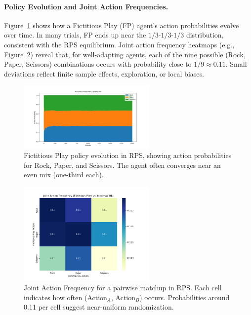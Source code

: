 \documentclass[11pt]{article}
\begin{document}
\paragraph{Policy Evolution and Joint Action Frequencies.}
Figure~\ref{fig:rps-fp-policy} shows how a Fictitious Play (FP) agent's 
action probabilities evolve over time. In many trials, FP ends up near 
the $1/3$-$1/3$-$1/3$ distribution, consistent with the RPS equilibrium. 
Joint action frequency heatmaps 
(e.g., Figure~\ref{fig:rps-joint-heatmap}) reveal that, for well-adapting 
agents, each of the nine possible (Rock, Paper, Scissors) combinations 
occurs with probability close to $1/9 \approx 0.11$. Small deviations 
reflect finite sample effects, exploration, or local biases.

\begin{figure}[htbp]
    \centering
    \includegraphics[width=0.6\textwidth]{rps-plots/fp_vs_mm_fictitious_play_policy_evolution.png}
    \caption{Fictitious Play policy evolution in RPS, showing action 
    probabilities for Rock, Paper, and Scissors. The agent often converges 
    near an even mix (one-third each).}
    \label{fig:rps-fp-policy}
\end{figure}

\begin{figure}[htbp]
    \centering
    \includegraphics[width=0.6\textwidth]{rps-plots/fp_vs_mm_joint_actions.png}
    \caption{Joint Action Frequency for a pairwise matchup in RPS. Each 
    cell indicates how often (Action$_{A}$, Action$_{B}$) occurs. 
    Probabilities around 0.11 per cell suggest near-uniform randomization.}
    \label{fig:rps-joint-heatmap}
\end{figure}
\end{document}
